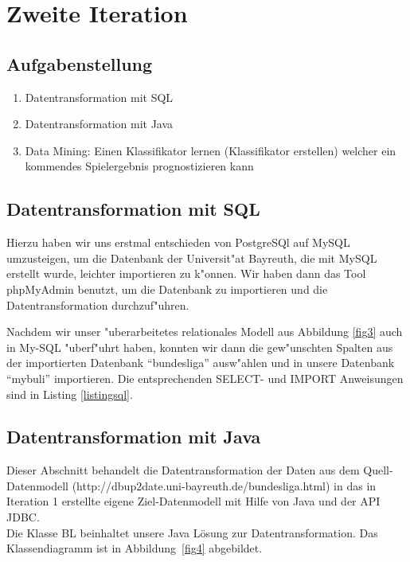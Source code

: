 \documentclass[
10pt,
a4paper
]{scrartcl}
\begin{document}
\section{ Zweite Iteration}

\subsection{Aufgabenstellung}

\begin{enumerate}
  \item Datentransformation mit SQL  
  \item Datentransformation mit Java
  \item Data Mining: Einen Klassifikator lernen (Klassifikator erstellen) welcher ein kommendes Spielergebnis prognostizieren kann
\end{enumerate}

\subsection{Datentransformation mit SQL}
Hierzu haben wir uns erstmal entschieden von PostgreSQl auf MySQL umzusteigen, um die Datenbank der Universit"at Bayreuth, die mit MySQL erstellt wurde, leichter importieren zu k"onnen. Wir haben dann das Tool phpMyAdmin benutzt, um die Datenbank zu importieren und die Datentransformation durchzuf"uhren.

Nachdem wir unser "uberarbeitetes relationales Modell aus Abbildung \ref{fig3} auch in My{-}SQL "uberf"uhrt haben, konnten wir dann die gew"unschten Spalten aus der importierten Datenbank "`bundesliga"' ausw"ahlen und in unsere Datenbank "`mybuli"' importieren. Die entsprechenden SELECT- und IMPORT Anweisungen sind in Listing \ref{listingsql}.



\subsection{Datentransformation mit Java}

Dieser Abschnitt behandelt die Datentransformation der Daten aus dem Quell-Datenmodell (http://dbup2date.uni-bayreuth.de/bundesliga.html) in das in Iteration 1 erstellte eigene Ziel-Datenmodell mit Hilfe von Java und der API JDBC.\\

Die Klasse BL beinhaltet unsere Java L\"{o}sung zur Datentransformation. Das Klassendiagramm ist in Abbildung~\ref{fig4} abgebildet.\\
\end{document}
